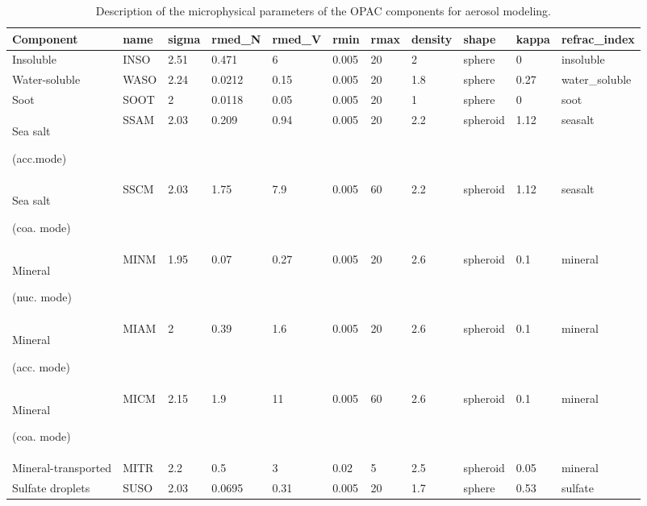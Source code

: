 \documentclass{article}
\begin{document}
\begin{table}[htbp] 
\centering 

\caption{Description of the microphysical parameters of the OPAC components for aerosol modeling.}
\small
\begin{tabular}{lllllllllll}
\hline
Component & name & sigma & rmed\_N & rmed\_V & rmin & rmax & density & shape & kappa & refrac\_index \\
\hline
Insoluble & INSO & 2.51 & 0.471 & 6 & 0.005 & 20 & 2 & sphere & 0 & insoluble \\
\hline
Water-soluble & WASO & 2.24 & 0.0212 & 0.15 & 0.005 & 20 & 1.8 & sphere & 0.27 & water\_soluble \\
\hline
Soot & SOOT & 2 & 0.0118 & 0.05 & 0.005 & 20 & 1 & sphere & 0 & soot \\
\hline
Sea salt

(acc.mode) & SSAM & 2.03 & 0.209 & 0.94 & 0.005 & 20 & 2.2 & spheroid & 1.12 & seasalt \\
\hline
Sea salt 

(coa. mode) & SSCM & 2.03 & 1.75 & 7.9 & 0.005 & 60 & 2.2 & spheroid & 1.12 & seasalt \\
\hline
Mineral

(nuc. mode) & MINM & 1.95 & 0.07 & 0.27 & 0.005 & 20 & 2.6 & spheroid & 0.1 & mineral \\
\hline
Mineral

(acc. mode) & MIAM & 2 & 0.39 & 1.6 & 0.005 & 20 & 2.6 & spheroid & 0.1 & mineral \\
\hline
Mineral

(coa. mode) & MICM & 2.15 & 1.9 & 11 & 0.005 & 60 & 2.6 & spheroid & 0.1 & mineral \\
\hline
Mineral-transported & MITR & 2.2 & 0.5 & 3 & 0.02 & 5 & 2.5 & spheroid & 0.05 & mineral \\
\hline
Sulfate droplets & SUSO & 2.03 & 0.0695 & 0.31 & 0.005 & 20 & 1.7 & sphere & 0.53 & sulfate \\
\hline

\end{tabular}

    \label{tab:opac_component}
\end{table}
\end{document}
